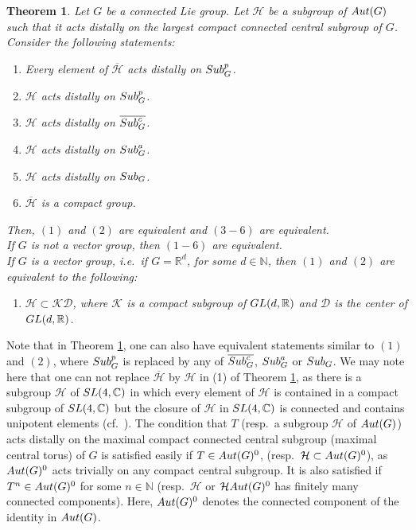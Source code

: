 \documentclass{amsart}
\numberwithin{equation}{section}
\newcommand{\Aut}{{\rm Aut}}
\newcommand{\Sub}{{\rm Sub}}
\newcommand{\N}{{\mathbb N}}
\newcommand{\R}{{\mathbb R}}
\newcommand{\C}{{\mathbb C}}
\newcommand{\Hc}{{\mathcal H}}
\newcommand{\K}{{\mathcal K}}
\newcommand{\D}{{\mathcal D}}
\newcommand{\spg}{{\rm Sub}^p_G}
\newcommand{\GL}{{\rm GL}}
\newcommand{\SL}{{\rm SL}}
\let\ol=\overline
\newtheorem{thm}{Theorem}[section]
\theoremstyle{remark}
\begin{document}
\begin{thm} \label{subgp-action} Let $G$ be a connected Lie group. Let $\Hc$ be a subgroup of $\Aut(G)$ 
such that it acts distally on the largest compact connected central subgroup of $G$. 
Consider the following statements:
\begin{enumerate}
\item Every element of $\ol{\Hc}$ acts distally on $\spg$. 
\item $\Hc$ acts distally on $\spg$.
\item $\Hc$ acts distally on $\ol{\Sub^c_G}$. 
\item $\Hc$ acts distally on $\Sub^a_G$. 
\item $\Hc$ acts distally on $\Sub_G$. 
\item $\ol{\Hc}$ is a compact group.
\end{enumerate}
\noindent Then, $(1)$ and $(2)$ are equivalent and $(3-6)$ are equivalent.\\ 
If $G$ is not a vector group, then $(1-6)$ are equivalent.\\
If $G$ is a vector group, i.e.\ if $G=\R^d$, for some $d\in\N$, then $(1)$ and $(2)$ are equivalent to the following:
\begin{enumerate}
\item[(7)] $\Hc\subset \K\D$, where $\K$ is a compact subgroup of $\GL(d,\R)$ and $\D$ is the center of $\GL(d,\R)$.
\end{enumerate}
\end{thm}

Note that in Theorem \ref{subgp-action}, one can also have equivalent statements similar to $(1)$ and $(2)$, where $\spg$ 
is replaced by any of $\ol{\Sub^c_G}$, $\Sub^a_G$ or $\Sub_G$. 
We may note here that one can not replace $\ol{\Hc}$ by $\Hc$ in (1) of Theorem \ref{subgp-action}, 
as there is a subgroup $\Hc$ of $\SL(4,\C)$ in which every element of $\Hc$ is contained in a compact subgroup 
of $\SL(4,\C)$ but the closure of $\Hc$ in $\SL(4,\C)$ is connected and contains unipotent elements (cf.\ \cite{Ba}). 
The condition that $T$ (resp.\ a subgroup $\Hc$ of $\Aut(G)$) acts distally on the maximal compact connected central 
subgroup (maximal central torus) of $G$ is satisfied easily if $T\in\Aut(G)^0$, 
(resp.\ $\Hc\subset \Aut(G)^0$), as $\Aut(G)^0$ acts trivially on any compact central subgroup. It is also satisfied if 
$T^n\in\Aut(G)^0$ for some $n\in\N$ (resp.\ $\Hc$ or $\Hc\Aut(G)^0$ has 
finitely many connected components). Here, $\Aut(G)^0$ denotes the connected component of the identity in $\Aut(G)$.
\end{document}
